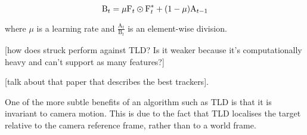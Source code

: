 \begin{equation}
\text{B}_t = \mu \text{F}_t \varodot \text{F}_t^* + (1 - \mu)\text{A}_{t-1}
\end{equation}

\noindent where $\mu$ is a learning rate and $\frac{\text{A}_t}{\text{B}_t}$ is an element-wise division.


[how does struck perform against TLD? Is it weaker because it's computationally heavy and can't support as many features?]  

[talk about that paper that describes the best trackers].

One of the more subtle benefits of an algorithm such as TLD is that it is invariant to camera motion. This is due to the fact that TLD localises the target relative to the camera reference frame, rather than to a world frame. 









